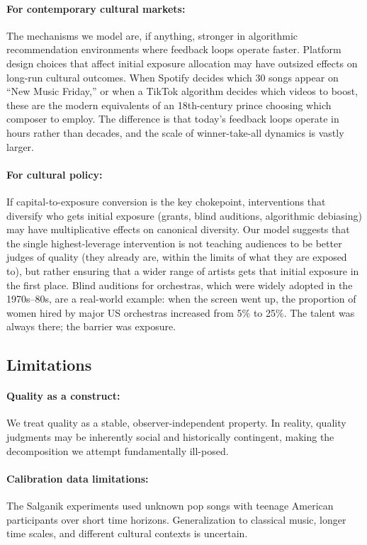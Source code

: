 \documentclass[11pt,a4paper]{article}
\begin{document}
\paragraph{For contemporary cultural markets:} The mechanisms we model are, if anything, stronger in algorithmic recommendation environments where feedback loops operate faster. Platform design choices that affect initial exposure allocation may have outsized effects on long-run cultural outcomes. When Spotify decides which 30 songs appear on ``New Music Friday,'' or when a TikTok algorithm decides which videos to boost, these are the modern equivalents of an 18th-century prince choosing which composer to employ. The difference is that today's feedback loops operate in hours rather than decades, and the scale of winner-take-all dynamics is vastly larger.

\paragraph{For cultural policy:} If capital-to-exposure conversion is the key chokepoint, interventions that diversify who gets initial exposure (grants, blind auditions, algorithmic debiasing) may have multiplicative effects on canonical diversity. Our model suggests that the single highest-leverage intervention is not teaching audiences to be better judges of quality (they already are, within the limits of what they are exposed to), but rather ensuring that a wider range of artists gets that initial exposure in the first place. Blind auditions for orchestras, which were widely adopted in the 1970s--80s, are a real-world example: when the screen went up, the proportion of women hired by major US orchestras increased from 5\% to 25\%. The talent was always there; the barrier was exposure.

\subsection{Limitations}

\paragraph{Quality as a construct:} We treat quality as a stable, observer-independent property. In reality, quality judgments may be inherently social and historically contingent, making the decomposition we attempt fundamentally ill-posed.

\paragraph{Calibration data limitations:} The Salganik experiments used unknown pop songs with teenage American participants over short time horizons. Generalization to classical music, longer time scales, and different cultural contexts is uncertain.
\end{document}
